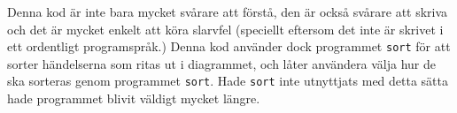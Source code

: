\documentclass[12pt,a4paper]{article}
\begin{document}
Denna kod är inte bara mycket svårare att förstå,
den är också svårare att skriva och det är mycket
enkelt att köra slarvfel (speciellt eftersom det
inte är skrivet i ett ordentligt programspråk.)
Denna kod använder dock programmet \texttt{sort}
för att sorter händelserna som ritas ut i diagrammet,
och låter användera välja hur de ska sorteras genom
programmet \texttt{sort}. Hade \texttt{sort} inte
utnyttjats med detta sätta hade programmet blivit
väldigt mycket längre.
\end{document}
